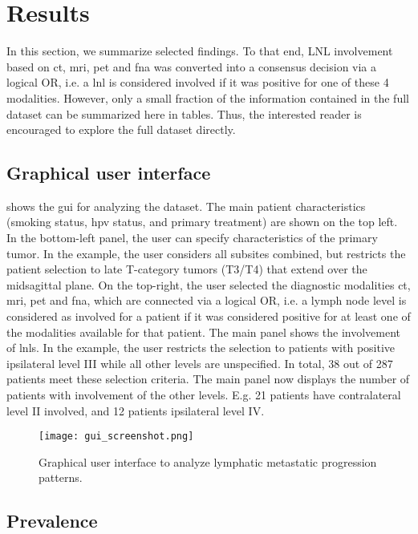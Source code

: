 \documentclass[\relativeRoot/main.tex]{subfiles}
\begin{document}
\section{Results}
\label{sec:dataset:results}

In this section, we summarize selected findings. To that end, LNL involvement based on \gls{ct}, \gls{mri}, \gls{pet} and \gls{fna} was converted into a consensus decision via a logical OR, i.e. a \gls{lnl} is considered involved if it was positive for one of these 4 modalities. However, only a small fraction of the information contained in the full dataset can be summarized here in tables. Thus, the interested reader is encouraged to explore the full dataset directly.

\subsection*{Graphical user interface}

 shows the \gls{gui} for analyzing the dataset. The main patient characteristics (smoking status, \gls{hpv} status, and primary treatment) are shown on the top left. In the bottom-left panel, the user can specify characteristics of the primary tumor. In the example, the user considers all subsites combined, but restricts the patient selection to late T-category tumors (T3/T4) that extend over the midsagittal plane. On the top-right, the user selected the diagnostic modalities \gls{ct}, \gls{mri}, \gls{pet} and \gls{fna}, which are connected via a logical OR, i.e. a lymph node level is considered as involved for a patient if it was considered positive for at least one of the modalities available for that patient. The main panel shows the involvement of \glspl{lnl}. In the example, the user restricts the selection to patients with positive ipsilateral level III while all other levels are unspecified. In total, 38 out of 287 patients meet these selection criteria. The main panel now displays the number of patients with involvement of the other levels. E.g. 21 patients have contralateral level II involved, and 12 patients ipsilateral level IV.

\begin{figure}
    \centering
    \texttt{[image: gui\_screenshot.png]}
    \caption{Graphical user interface to analyze lymphatic metastatic progression patterns.}
    \label{fig:dataset:gui_screenshot}
\end{figure}

\subsection*{Prevalence}
\end{document}
